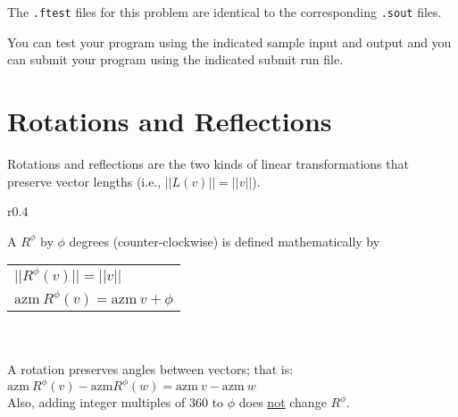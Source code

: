 \documentclass[12pt]{article}
\begin{document}
The {\tt .ftest} files for this problem are identical
to the corresponding {\tt .sout} files.

You can test your program using the indicated sample input and
output and you can submit your program using the indicated submit
run file.

\newpage

\section{Rotations and Reflections}
Rotations and reflections are the two kinds of linear transformations
that preserve vector lengths (i.e., $||L(v)||=||v||$).

\begin{minipage}{\textwidth}\raggedright
\begin{wrapfigure}[5]{r}{0.4\textwidth}
\end{wrapfigure}
A  $R^\phi$ by $\phi$ degrees (counter-\EOL clockwise)
is defined mathematically by
\hspace*{0.2in}\begin{tabular}[t]{l}
$||R^\phi(v)|| = ||v||$ \\
$\mathrm{azm}~R^\phi(v) = \mathrm{azm}~v + \phi$ \\
\end{tabular} \\
~\\
A rotation preserves angles between vectors; that is: \\
\hspace*{0.2in}$\mathrm{azm}~R^\phi(v)-\mathrm{azm}R^\phi(w)
               = \mathrm{azm}~v-\mathrm{azm}~w$ \\
Also, adding integer multiples of 360 to $\phi$
does \underline{not} change $R^\phi$.
\end{minipage}
\end{document}

